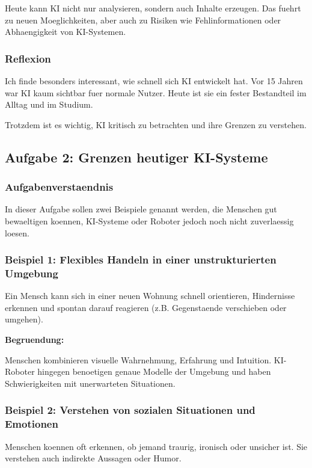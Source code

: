 \documentclass[12pt,a4paper]{article}
\begin{document}
Heute kann KI nicht nur analysieren, sondern auch Inhalte erzeugen.
Das fuehrt zu neuen Moeglichkeiten, aber auch zu Risiken wie
Fehlinformationen oder Abhaengigkeit von KI-Systemen.

\subsubsection*{Reflexion}

Ich finde besonders interessant, wie schnell sich KI entwickelt hat.
Vor 15 Jahren war KI kaum sichtbar fuer normale Nutzer.
Heute ist sie ein fester Bestandteil im Alltag und im Studium.

Trotzdem ist es wichtig, KI kritisch zu betrachten und ihre Grenzen zu verstehen.
\subsection{Aufgabe 2: Grenzen heutiger KI-Systeme}

\subsubsection*{Aufgabenverstaendnis}

In dieser Aufgabe sollen zwei Beispiele genannt werden, die Menschen gut
bewaeltigen koennen, KI-Systeme oder Roboter jedoch noch nicht zuverlaessig loesen.

\subsubsection*{Beispiel 1: Flexibles Handeln in einer unstrukturierten Umgebung}

Ein Mensch kann sich in einer neuen Wohnung schnell orientieren, Hindernisse erkennen
und spontan darauf reagieren (z.B. Gegenstaende verschieben oder umgehen).

\textbf{Begruendung:}

Menschen kombinieren visuelle Wahrnehmung, Erfahrung und Intuition.
KI-Roboter hingegen benoetigen genaue Modelle der Umgebung und haben Schwierigkeiten
mit unerwarteten Situationen.

\subsubsection*{Beispiel 2: Verstehen von sozialen Situationen und Emotionen}

Menschen koennen oft erkennen, ob jemand traurig, ironisch oder unsicher ist.
Sie verstehen auch indirekte Aussagen oder Humor.
\end{document}
